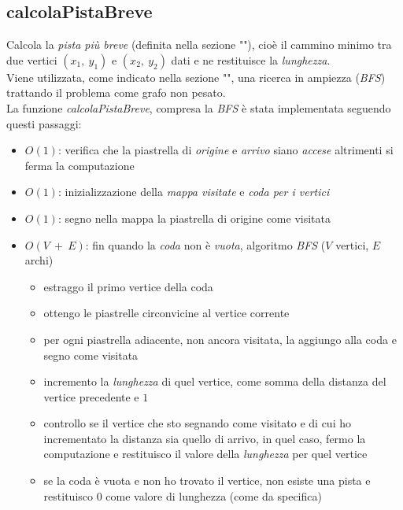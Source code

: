 \documentclass{article}
\begin{document}
\subsection{calcolaPistaBreve}\label{subsec:bfs}
Calcola la \textit{pista più breve} (definita nella sezione ""), cioè il cammino minimo tra due vertici \((x_1,\ y_1)\) e \((x_2,\ y_2)\) dati e ne restituisce la \textit{lunghezza}.\\
Viene utilizzata, come indicato nella sezione "", una ricerca in ampiezza (\textit{BFS}) trattando il problema come grafo non pesato.\\
La funzione \textit{calcolaPistaBreve}, compresa la \textit{BFS} è stata implementata seguendo questi passaggi:\\
\begin{itemize}
  \item \(O(1)\): verifica che la piastrella di \textit{origine} e \textit{arrivo} siano \textit{accese} altrimenti si ferma la computazione
  \item \(O(1)\): inizializzazione della \textit{mappa visitate} e \textit{coda per i vertici}
  \item \(O(1)\): segno nella mappa la piastrella di origine come visitata
  \item \(O(V\ +\ E)\): fin quando la \textit{coda} non è \textit{vuota}, algoritmo \textit{BFS} (\(V\) vertici, \(E\) archi)
  \begin{itemize}
    \item estraggo il primo vertice della coda
    \item ottengo le piastrelle circonvicine al vertice corrente
    \item per ogni piastrella adiacente, non ancora visitata, la aggiungo alla coda e segno come visitata
    \item incremento la \textit{lunghezza} di quel vertice, come somma della distanza del vertice precedente e \(1\)
    \item controllo se il vertice che sto segnando come visitato e di cui ho incrementato la distanza sia quello di arrivo, in quel caso, fermo la computazione e restituisco il valore della \textit{lunghezza} per quel vertice
    \item se la coda è vuota e non ho trovato il vertice, non esiste una pista e restituisco \(0\) come valore di lunghezza (come da specifica)
  \end{itemize}
\end{itemize}
\end{document}
